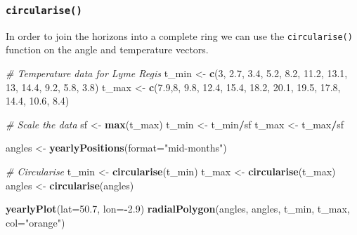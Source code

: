 \documentclass[
]{book}
\newenvironment{Shaded}{\begin{snugshade}}{\end{snugshade}}
\newcommand{\AttributeTok}[1]{\textcolor[rgb]{0.13,0.29,0.53}{#1}}
\newcommand{\CommentTok}[1]{\textcolor[rgb]{0.56,0.35,0.01}{\textit{#1}}}
\newcommand{\DecValTok}[1]{\textcolor[rgb]{0.00,0.00,0.81}{#1}}
\newcommand{\FloatTok}[1]{\textcolor[rgb]{0.00,0.00,0.81}{#1}}
\newcommand{\FunctionTok}[1]{\textcolor[rgb]{0.13,0.29,0.53}{\textbf{#1}}}
\newcommand{\NormalTok}[1]{#1}
\newcommand{\OtherTok}[1]{\textcolor[rgb]{0.56,0.35,0.01}{#1}}
\newcommand{\SpecialCharTok}[1]{\textcolor[rgb]{0.81,0.36,0.00}{\textbf{#1}}}
\newcommand{\StringTok}[1]{\textcolor[rgb]{0.31,0.60,0.02}{#1}}
\begin{document}
\hypertarget{circularise}{%
\subsubsection{\texorpdfstring{\texttt{circularise()}}{circularise()}}\label{circularise}}

In order to join the horizons into a complete ring we can use the \texttt{circularise()} function on the angle and temperature vectors.

\begin{Shaded}
\begin{Highlighting}[]
\CommentTok{\# Temperature data for Lyme Regis}
\NormalTok{t\_min }\OtherTok{\textless{}{-}} \FunctionTok{c}\NormalTok{(}\DecValTok{3}\NormalTok{, }\FloatTok{2.7}\NormalTok{, }\FloatTok{3.4}\NormalTok{, }\FloatTok{5.2}\NormalTok{, }\FloatTok{8.2}\NormalTok{, }\FloatTok{11.2}\NormalTok{, }\FloatTok{13.1}\NormalTok{, }\DecValTok{13}\NormalTok{, }\FloatTok{14.4}\NormalTok{, }\FloatTok{9.2}\NormalTok{, }\FloatTok{5.8}\NormalTok{, }\FloatTok{3.8}\NormalTok{)}
\NormalTok{t\_max }\OtherTok{\textless{}{-}} \FunctionTok{c}\NormalTok{(}\FloatTok{7.9}\NormalTok{,}\DecValTok{8}\NormalTok{, }\FloatTok{9.8}\NormalTok{, }\FloatTok{12.4}\NormalTok{, }\FloatTok{15.4}\NormalTok{, }\FloatTok{18.2}\NormalTok{, }\FloatTok{20.1}\NormalTok{, }\FloatTok{19.5}\NormalTok{, }\FloatTok{17.8}\NormalTok{, }\FloatTok{14.4}\NormalTok{, }\FloatTok{10.6}\NormalTok{, }\FloatTok{8.4}\NormalTok{)}

\CommentTok{\# Scale the data}
\NormalTok{sf }\OtherTok{\textless{}{-}} \FunctionTok{max}\NormalTok{(t\_max)}
\NormalTok{t\_min }\OtherTok{\textless{}{-}}\NormalTok{ t\_min}\SpecialCharTok{/}\NormalTok{sf}
\NormalTok{t\_max }\OtherTok{\textless{}{-}}\NormalTok{ t\_max}\SpecialCharTok{/}\NormalTok{sf}

\NormalTok{angles }\OtherTok{\textless{}{-}} \FunctionTok{yearlyPositions}\NormalTok{(}\AttributeTok{format=}\StringTok{"mid{-}months"}\NormalTok{)}

\CommentTok{\# Circularise}
\NormalTok{t\_min }\OtherTok{\textless{}{-}} \FunctionTok{circularise}\NormalTok{(t\_min)}
\NormalTok{t\_max }\OtherTok{\textless{}{-}} \FunctionTok{circularise}\NormalTok{(t\_max)}
\NormalTok{angles }\OtherTok{\textless{}{-}} \FunctionTok{circularise}\NormalTok{(angles)}

\FunctionTok{yearlyPlot}\NormalTok{(}\AttributeTok{lat=}\FloatTok{50.7}\NormalTok{, }\AttributeTok{lon=}\SpecialCharTok{{-}}\FloatTok{2.9}\NormalTok{)}
\FunctionTok{radialPolygon}\NormalTok{(angles, angles, t\_min, t\_max, }\AttributeTok{col=}\StringTok{"orange"}\NormalTok{)}
\end{Highlighting}
\end{Shaded}
\end{document}

